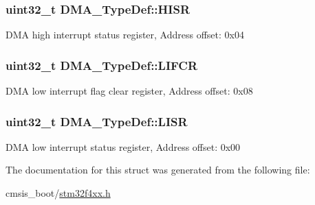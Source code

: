 \subsubsection[{\texorpdfstring{H\+I\+SR}{HISR}}]{ uint32\+\_\+t D\+M\+A\+\_\+\+Type\+Def\+::\+H\+I\+SR}\hypertarget{struct_d_m_a___type_def_a01a90a5fcd6459e10b81c0ab737dd2e3}{}\label{struct_d_m_a___type_def_a01a90a5fcd6459e10b81c0ab737dd2e3}
D\+MA high interrupt status register, Address offset\+: 0x04 
\subsubsection[{\texorpdfstring{L\+I\+F\+CR}{LIFCR}}]{ uint32\+\_\+t D\+M\+A\+\_\+\+Type\+Def\+::\+L\+I\+F\+CR}\hypertarget{struct_d_m_a___type_def_a11adb689c874d38b49fa44990323b653}{}\label{struct_d_m_a___type_def_a11adb689c874d38b49fa44990323b653}
D\+MA low interrupt flag clear register, Address offset\+: 0x08 
\subsubsection[{\texorpdfstring{L\+I\+SR}{LISR}}]{ uint32\+\_\+t D\+M\+A\+\_\+\+Type\+Def\+::\+L\+I\+SR}\hypertarget{struct_d_m_a___type_def_aacb4a0977d281bc809cb5974e178bc2b}{}\label{struct_d_m_a___type_def_aacb4a0977d281bc809cb5974e178bc2b}
D\+MA low interrupt status register, Address offset\+: 0x00 

The documentation for this struct was generated from the following file\+:\begin{DoxyCompactItemize}
\item 
cmsis\+\_\+boot/\hyperlink{stm32f4xx_8h}{stm32f4xx.\+h}\end{DoxyCompactItemize}
